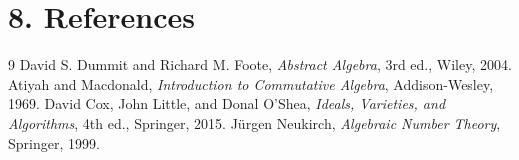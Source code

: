 \section*{8. References}

\begin{thebibliography}{9}
 David S. Dummit and Richard M. Foote, \emph{Abstract Algebra}, 3rd ed., Wiley, 2004.
 Atiyah and Macdonald, \emph{Introduction to Commutative Algebra}, Addison-Wesley, 1969.
 David Cox, John Little, and Donal O'Shea, \emph{Ideals, Varieties, and Algorithms}, 4th ed., Springer, 2015.
 Jürgen Neukirch, \emph{Algebraic Number Theory}, Springer, 1999.
\end{thebibliography}
